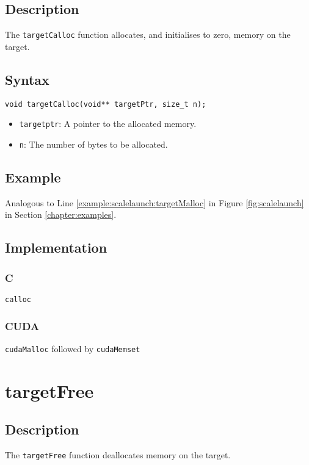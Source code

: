 \subsection{Description}

The \verb+targetCalloc+ function allocates, and initialises to zero, memory on the target.

\subsection{Syntax}
\begin{verbatim}
void targetCalloc(void** targetPtr, size_t n);
\end{verbatim}

\begin{itemize}
\item \verb+targetptr+: A pointer to the allocated memory.
\item \verb+n+: The number of bytes to be allocated.
\end{itemize}


\subsection{Example}
Analogous to Line \ref{example:scalelaunch:targetMalloc} in Figure \ref{fig:scalelaunch} in Section \ref{chapter:examples}.

\subsection{Implementation}
\subsubsection{C}
\verb+calloc+
\subsubsection{CUDA}
\verb+cudaMalloc+ followed by \verb+cudaMemset+

\newpage
\section{targetFree}

\subsection{Description}

The \verb+targetFree+ function deallocates memory on the target.

